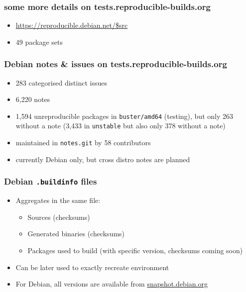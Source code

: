 \documentclass[14pt,aspectratio=169]{beamer}
\begin{document}
\begin{frame}
 \frametitle{some more details on tests.reproducible-builds.org}

 \begin{itemize}
  \item \url{https://reproducible.debian.net/$src}
  \item<2> 49 package sets 
 \end{itemize}
\end{frame}

\begin{frame}
	\frametitle{Debian notes \& issues on tests.reproducible-builds.org}

 \begin{itemize}
  \item 283 categorised distinct issues
  \item 6,220 notes
  \item 1,594 unreproducible packages in \texttt{buster/amd64} (testing), but only
  263 without a note (3,433 in \texttt{unstable} but also only 378 without a
  note)
  \item maintained in \texttt{notes.git} by 58 contributors
  \item currently Debian only, but cross distro notes are planned
 \end{itemize}
\end{frame}


\begin{frame}
 \frametitle{Debian \texttt{.buildinfo} files}

 \begin{itemize}
  \item Aggregates in the same file:
   \begin{itemize}
    \item Sources (checksums)
    \item Generated binaries (checksums)
    \item Packages used to build (with specific version, checksums coming soon)
   \end{itemize}
  \item Can be later used to exactly recreate environment
  \item For Debian, all versions are available from \url{snapshot.debian.org}
 \end{itemize}
\end{frame}
\end{document}
